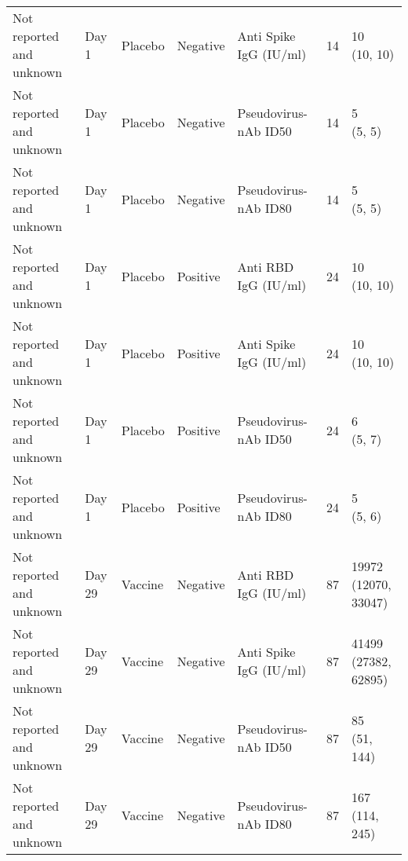 \documentclass[]{book}
\theoremstyle{definition}
\theoremstyle{definition}
\theoremstyle{definition}
\newcommand{\1}{\mathbbm{1}}
\begin{document}
\begin{landscape}
\begin{ThreePartTable}
\begin{longtable}[t]{>{\raggedright\arraybackslash}p{7cm}llllll}
\hspace{1em}Not reported and unknown & Day 1 & Placebo & Negative & Anti Spike IgG (IU/ml) & 14 & \makecell[l]{10\\(10, 10)}\\
\hspace{1em}Not reported and unknown & Day 1 & Placebo & Negative & Pseudovirus-nAb ID50 & 14 & \makecell[l]{5\\(5, 5)}\\
\hspace{1em}Not reported and unknown & Day 1 & Placebo & Negative & Pseudovirus-nAb ID80 & 14 & \makecell[l]{5\\(5, 5)}\\
\hspace{1em}Not reported and unknown & Day 1 & Placebo & Positive & Anti RBD IgG (IU/ml) & 24 & \makecell[l]{10\\(10, 10)}\\
\hspace{1em}Not reported and unknown & Day 1 & Placebo & Positive & Anti Spike IgG (IU/ml) & 24 & \makecell[l]{10\\(10, 10)}\\
\hspace{1em}Not reported and unknown & Day 1 & Placebo & Positive & Pseudovirus-nAb ID50 & 24 & \makecell[l]{6\\(5, 7)}\\
\hspace{1em}Not reported and unknown & Day 1 & Placebo & Positive & Pseudovirus-nAb ID80 & 24 & \makecell[l]{5\\(5, 6)}\\
\hspace{1em}Not reported and unknown & Day 29 & Vaccine & Negative & Anti RBD IgG (IU/ml) & 87 & \makecell[l]{19972\\(12070, 33047)}\\
\hspace{1em}Not reported and unknown & Day 29 & Vaccine & Negative & Anti Spike IgG (IU/ml) & 87 & \makecell[l]{41499\\(27382, 62895)}\\
\hspace{1em}Not reported and unknown & Day 29 & Vaccine & Negative & Pseudovirus-nAb ID50 & 87 & \makecell[l]{85\\(51, 144)}\\
\hspace{1em}Not reported and unknown & Day 29 & Vaccine & Negative & Pseudovirus-nAb ID80 & 87 & \makecell[l]{167\\(114, 245)}\\

\end{longtable}
\end{ThreePartTable}
\end{landscape}
\end{document}
